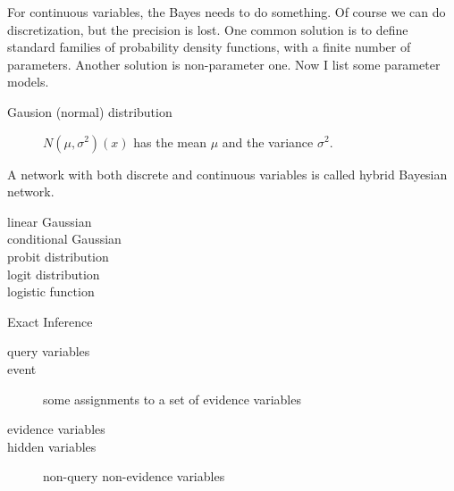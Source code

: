 For continuous variables, the Bayes needs to do something.  Of course
we can do discretization, but the precision is lost.  One common
solution is to define standard families of probability density
functions, with a finite number of parameters.
Another solution is non-parameter one.
Now I list some parameter models.

\begin{description}
\item [Gausion (normal) distribution] $N(\mu, \sigma^2)(x)$ has the mean $\mu$ and the variance $\sigma^2$.
\end{description}


A network with both discrete and continuous variables is called hybrid
Bayesian network.
\begin{description}
\item [linear Gaussian]
\item [conditional Gaussian]
\item [probit distribution]
\item [logit distribution]
\item [logistic function]
\end{description}

Exact Inference
\begin{description}
\item [query variables]
\item [event] some assignments to a set of evidence variables
\item [evidence variables]
\item [hidden variables] non-query non-evidence variables
\end{description}





